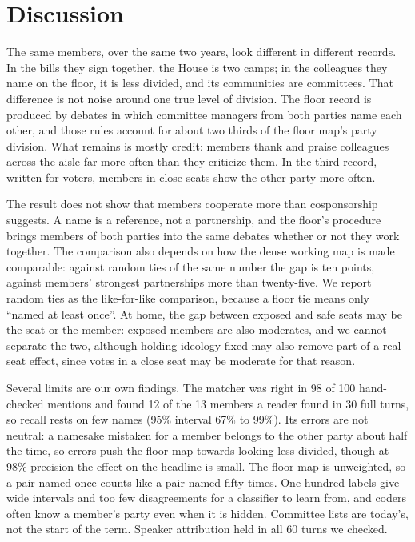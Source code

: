 \documentclass[9pt,twocolumn,twoside]{pnas-new}
\begin{document}
\section*{Discussion}
The same members, over the same two years, look different in different records. In the bills they sign together,
the House is two camps; in the colleagues they name on the floor, it is less divided, and its communities are
committees. That difference is not noise around one true level of division. The floor record is produced by
debates in which committee managers from both parties name each other, and those rules account for about two
thirds of the floor map's party division. What remains is mostly credit: members thank and praise colleagues
across the aisle far more often than they criticize them. In the third record, written for voters, members in
close seats show the other party more often.

The result does not show that members cooperate more than cosponsorship suggests. A name is a reference, not a
partnership, and the floor's procedure brings members of both parties into the same debates whether or not they
work together. The comparison also depends on how the dense working map is made comparable: against random ties
of the same number the gap is ten points, against members' strongest partnerships more than twenty-five. We report
random ties as the like-for-like comparison, because a floor tie means only ``named at least once''. At home, the
gap between exposed and safe seats may be the seat or the member: exposed members are also moderates, and we
cannot separate the two, although holding ideology fixed may also remove part of a real seat effect, since votes
in a close seat may be moderate for that reason.

Several limits are our own findings. The matcher was right in 98 of 100 hand-checked mentions and found 12 of the
13 members a reader found in 30 full turns, so recall rests on few names (95\% interval 67\% to 99\%). Its errors
are not neutral: a namesake mistaken for a member belongs to the other party about half the time, so errors push
the floor map towards looking less divided, though at 98\% precision the effect on the headline is small. The
floor map is unweighted, so a pair named once counts like a pair named fifty times. One hundred labels give wide
intervals and too few disagreements for a classifier to learn from, and coders often know a member's party even
when it is hidden. Committee lists are today's, not the start of the term. Speaker attribution held in all 60
turns we checked.
\end{document}
